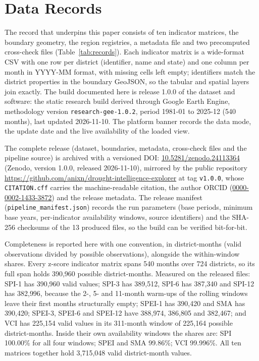 \documentclass[10pt,a4paper]{article}
\begin{document}
\section*{Data Records}
The record that underpins this paper consists of ten indicator matrices, the boundary geometry, the region registries, a metadata file and two precomputed cross-check files (Table~\ref{tab:records}). Each indicator matrix is a wide-format CSV with one row per district (identifier, name and state) and one column per month in YYYY-MM format, with missing cells left empty; identifiers match the district properties in the boundary GeoJSON, so the tabular and spatial layers join exactly. The build documented here is release 1.0.0 of the dataset and software: the static research build derived through Google Earth Engine, methodology version \texttt{research-gee-1.0.2}, period 1981-01 to 2025-12 (540 months), last updated 2026-11-10. The platform banner records the data mode, the update date and the live availability of the loaded view.

The complete release (dataset, boundaries, metadata, cross-check files and the pipeline source) is archived with a versioned DOI: \href{https://doi.org/10.5281/zenodo.24113364}{10.5281/zenodo.24113364} (Zenodo, version 1.0.0, released 2026-11-10), mirrored by the public repository \url{https://github.com/anixn/drought-intelligence-explorer} at tag \texttt{v1.0.0}, whose \texttt{CITATION.cff} carries the machine-readable citation, the author ORCID (\href{https://orcid.org/0000-0002-1433-3872}{0000-0002-1433-3872}) and the release metadata. The release manifest (\texttt{pipeline\_manifest.json}) records the run parameters (base periods, minimum base years, per-indicator availability windows, source identifiers) and the SHA-256 checksums of the 13 produced files, so the build can be verified bit-for-bit.

Completeness is reported here with one convention, in district-months (valid observations divided by possible observations), alongside the within-window shares. Every z-score indicator matrix spans 540 months over 724 districts, so its full span holds 390{,}960 possible district-months. Measured on the released files: SPI-1 has 390{,}960 valid values; SPI-3 has 389{,}512, SPI-6 has 387{,}340 and SPI-12 has 382{,}996, because the 2-, 5- and 11-month warm-ups of the rolling windows leave their first months structurally empty; SPEI-1 has 390{,}420 and SMA has 390{,}420; SPEI-3, SPEI-6 and SPEI-12 have 388{,}974, 386{,}805 and 382{,}467; and VCI has 225{,}154 valid values in its 311-month window of 225{,}164 possible district-months. Inside their own availability windows the shares are: SPI 100.00\% for all four windows; SPEI and SMA 99.86\%; VCI 99.996\%. All ten matrices together hold 3{,}715{,}048 valid district-month values.
\end{document}
